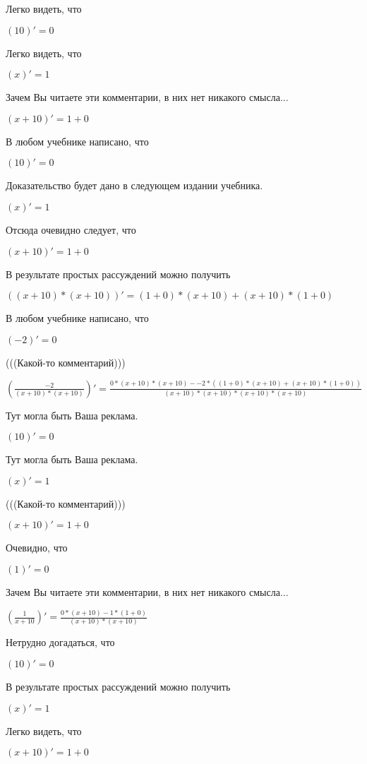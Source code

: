 \documentclass[12pt,a4paper,fleqn]{article}
\theoremstyle{definition}
\begin{document}
Легко видеть, что

$( 10 )' =  0 $

Легко видеть, что

$( x )' =  1 $

Зачем Вы читаете эти комментарии, в них нет никакого смысла...

$( x  +  10 )' =  1  +  0 $

В любом учебнике написано, что

$( 10 )' =  0 $

Доказательство будет дано в следующем издании учебника.

$( x )' =  1 $

Отсюда очевидно следует, что

$( x  +  10 )' =  1  +  0 $

В результате простых рассуждений можно получить

$(( x  +  10 ) * ( x  +  10 ))' = ( 1  +  0 ) * ( x  +  10 ) + ( x  +  10 ) * ( 1  +  0 )$

В любом учебнике написано, что

$( -2 )' =  0 $

(((Какой-то комментарий)))

$(\frac{ -2 }{( x  +  10 ) * ( x  +  10 )}
)' = \frac{ 0  * ( x  +  10 ) * ( x  +  10 ) -  -2  * (( 1  +  0 ) * ( x  +  10 ) + ( x  +  10 ) * ( 1  +  0 ))}{( x  +  10 ) * ( x  +  10 ) * ( x  +  10 ) * ( x  +  10 )}
$

Тут могла быть Ваша реклама.

$( 10 )' =  0 $

Тут могла быть Ваша реклама.

$( x )' =  1 $

(((Какой-то комментарий)))

$( x  +  10 )' =  1  +  0 $

Очевидно, что

$( 1 )' =  0 $

Зачем Вы читаете эти комментарии, в них нет никакого смысла...

$(\frac{ 1 }{ x  +  10 }
)' = \frac{ 0  * ( x  +  10 ) -  1  * ( 1  +  0 )}{( x  +  10 ) * ( x  +  10 )}
$

Нетрудно догадаться, что

$( 10 )' =  0 $

В результате простых рассуждений можно получить

$( x )' =  1 $

Легко видеть, что

$( x  +  10 )' =  1  +  0 $
\end{document}
